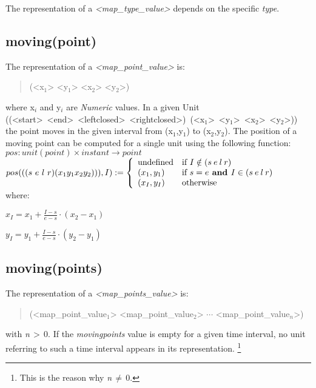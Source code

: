 \documentclass[english,a4paper]{article}
\begin{document}
\vspace*{3em}
The representation of a \emph{<map\_type\_value>} depends on the specific
\emph{type}.


\subsection{moving(point)}

The representation of a \emph{<map\_point\_value>} is:

\begin{quotation}
   (<x$_1$> <y$_1$> <x$_2$> <y$_2$>)
\end{quotation}
where x$_i$ and y$_i$ are \emph{Numeric} values. In a given Unit\\
\mbox{((<start> <end> <leftclosed> <rightclosed>) (<x$_1$> <y$_1$> <x$_2$> <y$_2$>))}
the point moves in the given interval from (x$_1$,y$_1$) to (x$_2$,y$_2$).
The position of a moving point can be computed for a single unit
using the following function:\\
 $ {pos} : {unit(point)} \times {instant} \rightarrow {point} $ \\
 $ {pos}(((s\ e\ l\ r) (x_1 y_1 x_2 y_2))),I) := \left\{
   \begin{array} {ll}
         \mbox{undefined} & \mbox{if } I \notin (s\: e\: l\: r) \\
         (x_1,y_1) & \mbox{if } s=e \mbox{\bf{} and } I \in (s\: e\: l\: r)\\
         (x_I,y_I) &  \mbox{otherwise}
   \end{array}
    \right. $\\[1em]

  where:\nopagebreak[4] \begin{description} \nopagebreak[4]
       \item $x_I = x_1+\frac{I-s}{e-s}\cdot(x_2 - x_1) $
       \item $y_I = y_1+\frac{I-s}{e-s}\cdot(y_2 - y_1) $
  \end{description}



\subsection{moving(points)}

The representation of a \emph{<map\_points\_value>} is:

\begin{quotation}
(<map\_point\_value$_{1}$> <map\_point\_value$_{2}$> $\cdots $
<map\_point\_value$_{n}$>)
\end{quotation}
with \emph{n}$\, >\, $0. If the \emph{movingpoints} value is empty
for a given time interval, no unit referring to such a time interval
appears in its representation.%
\footnote{This is the reason why \emph{n}$\, \neq \, $0.%
}
\end{document}
